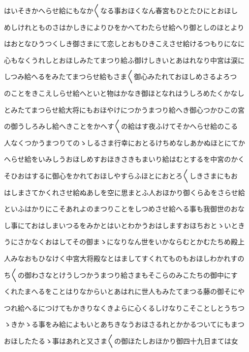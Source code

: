 \documentclass[a4paper,11pt,landscape]{ltjtarticle}
\begin{document}
\par\medskip
はいそきかへらせ給にもなか〱なる事おほくなん春宮もひとたひにとおほし
\par\medskip
めしけれとものさはかしきによりひをかへてわたらせ給へり御としのほとより
\par\medskip
はおとなひうつくしき御さまにて恋しとおもひきこえさせ給けるつもりになに
\par\medskip
心もなくうれしとおほしみたてまつり給ふ御けしきいとあはれなり中宮は涙に
\par\medskip
しつみ給へるをみたてまつらせ給もさま〱御心みたれておほしめさるよろつ
\par\medskip
のことをきこえしらせ給へといと物はかなき御ほとなれはうしろめたくかなし
\par\medskip
とみたてまつらせ給大将にもおほやけにつかうまつり給へき御心つかひこの宮
\par\medskip
の御うしろみし給へきことをかへす〱の給はす夜ふけてそかへらせ給のこる
\par\medskip
人なくつかうまつりてのゝしるさま行幸におとるけちめなしあかぬほとにてか
\par\medskip
へらせ給をいみしうおほしめすおほきさきもまいり給はむとするを中宮のかく
\par\medskip
そひおはするに御心をかれておほしやすらふほとにおとろ〱しきさまにもお
\par\medskip
はしまさてかくれさせ給ぬあしを空に思まとふ人おほかり御くらゐをさらせ給
\par\medskip
といふはかりにこそあれよのまつりことをしつめさせ給へる事も我御世のおな
\par\medskip
し事にておはしまいつるをみかとはいとわかうおはしますおほちおとゝいとき
\par\medskip
うにさかなくおはしてその御まゝになりなん世をいかならむとかむたちめ殿上
\par\medskip
人みなおもひなけく中宮大将殿なとはましてすくれてものもおほしわかれすの
\par\medskip
ち〱の御わさなとけうしつかうまつり給さまもそこらのみこたちの御中にす
\par\medskip
くれたまへるをことはりなからいとあはれに世人もみたてまつる藤の御そにや
\par\medskip
つれ給へるにつけてもかきりなくきよらに心くるしけなりこそことしとうちつ
\par\medskip
ゝきかゝる事をみ給によもいとあちきなうおほさるれとかかるついてにもまつ
\par\medskip
おほしたたるゝ事はあれと又さま〱の御ほたしおほかり御四十九日まては女
\par\medskip
\end{document}
